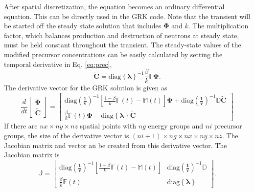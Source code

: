 \documentclass{ansconf}
\numberwithin{equation}{section}
\begin{document}
After spatial discretization, the equation becomes an ordinary differential equation. This can be directly used in the GRK code. Note that the transient will be started off the steady state solution that includes $\boldsymbol{\Phi}$ and $k$.  The multiplication factor, which balances production and destruction of neutrons at steady state, must be held constant throughout the transient. The steady-state values of the modified precursor concentrations can be easily calculated by setting the temporal derivative in Eq. \eqref{eq:prec},
\begin{equation}
    \widetilde{\boldsymbol{C}} = \mathrm{diag}\left\lbrace\boldsymbol{\lambda}\right\rbrace^{-1}\frac{\beta}{k}\mathbb{F}\boldsymbol{\Phi}.
\end{equation}
The derivative vector for the GRK solution is given as
\begin{equation}
    \frac{d}{dt}\left[\begin{array}{c}
    \boldsymbol{\Phi} \\ \widetilde{\boldsymbol{C}} \end{array}\right] = 
    \left[\begin{array}{c}
    \mathrm{diag}\left(\boldsymbol{\frac{1}{v}}\right)^{-1}\left[\frac{1-\beta}{k}\mathbb{F}\left(t\right) - \mathbb{M}\left(t\right)\right]\boldsymbol{\Phi} + \mathrm{diag}\left(\boldsymbol{\frac{1}{v}}\right)^{-1}\mathbb{D}\widetilde{\boldsymbol{C}} \\
    \frac{\beta}{k}\mathbb{F}\left(t\right)\boldsymbol{\Phi} -  \mathrm{diag}\left\lbrace\boldsymbol{\lambda}\right\rbrace
    \widetilde{\boldsymbol{C}}
    \end{array}\right]
\end{equation}
If there are $nx\times ny\times nz$ spatial points with $ng$ energy groups and $ni$ precursor groups, the size of the derivative vector is $\left(ni+1\right)\times ng\times nx\times ny\times nz$. The Jacobian matrix and vector an be created from this derivative vector. The Jacobian matrix is
\begin{equation}
    \mathbb{J} = \left[ \begin{array}{cc} 
    \mathrm{diag}\left(\boldsymbol{\frac{1}{v}}\right)^{-1}\left[\frac{1-\beta}{k}\mathbb{F}\left(t\right) - \mathbb{M}\left(t\right)\right] & \mathrm{diag}\left(\boldsymbol{\frac{1}{v}}\right)^{-1}\mathbb{D} \\
     \frac{\beta}{k}\mathbb{F}\left(t\right) & \mathrm{diag}\left\lbrace\boldsymbol{\lambda}\right\rbrace
    \end{array}\right].
\end{equation}
\end{document}
